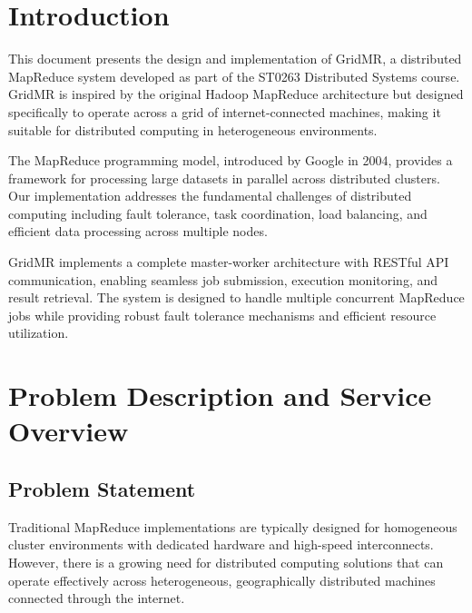 \documentclass[11pt,letterpaper,oneside]{article}
\begin{document}


\tableofcontents

\iftotalfigures
    \listoffigures
\fi

\listoftables

\clearpage

\section{Introduction}

This document presents the design and implementation of GridMR, a distributed MapReduce system developed as part of the ST0263 Distributed Systems course. GridMR is inspired by the original Hadoop MapReduce architecture but designed specifically to operate across a grid of internet-connected machines, making it suitable for distributed computing in heterogeneous environments.

The MapReduce programming model, introduced by Google in 2004, provides a framework for processing large datasets in parallel across distributed clusters. Our implementation addresses the fundamental challenges of distributed computing including fault tolerance, task coordination, load balancing, and efficient data processing across multiple nodes.

GridMR implements a complete master-worker architecture with RESTful API communication, enabling seamless job submission, execution monitoring, and result retrieval. The system is designed to handle multiple concurrent MapReduce jobs while providing robust fault tolerance mechanisms and efficient resource utilization.


\section{Problem Description and Service Overview}

\subsection{Problem Statement}

Traditional MapReduce implementations are typically designed for homogeneous cluster environments with dedicated hardware and high-speed interconnects. However, there is a growing need for distributed computing solutions that can operate effectively across heterogeneous, geographically distributed machines connected through the internet.
\end{document}
